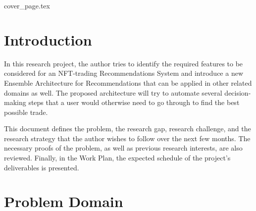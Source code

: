 \documentclass[a4paper, 12pt, oneside]{report}
\begin{document}

{cover_page.tex}


\tableofcontents

{\let\clearpage\relax
\listoffigures}
{\let\clearpage\relax
\listoftables}
{\let\clearpage\relax
\printglossary[type=\acronymtype
]}


\onehalfspacing %

\chapter{Introduction}

\setcounter{page}{1} %

 In this research project, the author tries to identify the required features to be considered for an NFT-trading Recommendations System and introduce a new Ensemble Architecture for Recommendations that can be applied in other related domains as well. The proposed architecture will try to automate several decision-making steps that a user would otherwise need to go through to find the best possible trade.

This document defines the problem, the research gap, research challenge, and the research strategy that the author wishes to follow over the next few months. The necessary proofs of the problem, as well as previous research interests, are also reviewed. Finally, in the Work Plan, the expected schedule of the project's deliverables is presented.


\begingroup
\let\clearpage\relax


\chapter{Problem Domain}
\end{document}
